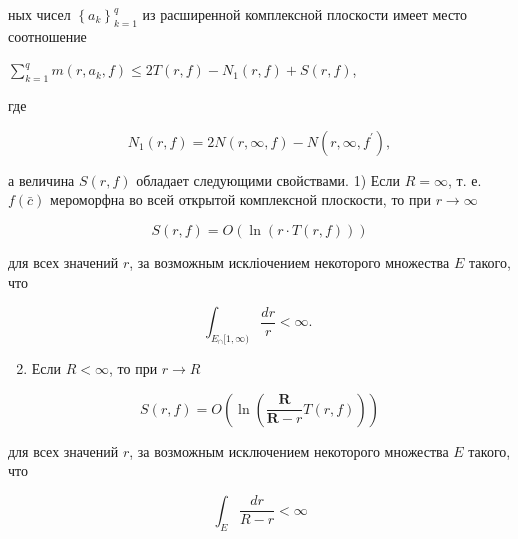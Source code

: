 \documentclass[10pt]{article}
\begin{document}
ных чисел $\left\{a_{k}\right\}_{k=1}^{q}$ из расширенной комплексной плоскости имеет место соотношение



$\sum_{k=1}^{q} m\left(r, a_{k}, f\right) \leqslant 2 T(r, f)-N_{1}(r, f)+S(r, f)$,



где



\[

N_{1}(r, f)=2 N(r, \infty, f)-N\left(r, \infty, f^{\prime}\right),

\]



а величина $S(r, f)$ обладает следующими свойствами. 1) Если $R=\infty$, т. е. $f(\bar{c})$ мероморфна во всей открытой комплексной плоскости, то при $r \rightarrow \infty$



\[

S(r, f)=O(\ln (r \cdot T(r, f)))

\]



для всех значений $r$, за возможным искліочением некоторого множества $E$ такого, что



\[

\int_{E_{\cap}[1, \infty)} \frac{d r}{r}<\infty \text {. }

\]



\begin{enumerate}

  \setcounter{enumi}{1}

  \item Если $R<\infty$, то при $r \rightarrow R$

\end{enumerate}



\[

S(r, f)=O\left(\ln \left(\frac{\boldsymbol{R}}{\boldsymbol{R}-r} T(r, f)\right)\right)

\]



для всех значений $r$, за возможным исключением некоторого множества $E$ такого, что



\[

\int_{E} \frac{d r}{R-r}<\infty

\]
\end{document}
